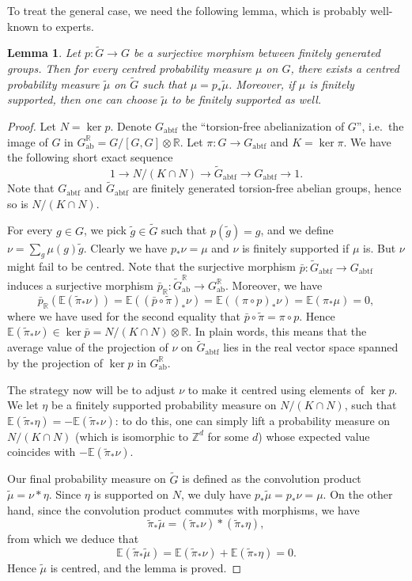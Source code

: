\documentclass[11pt,leqno]{article}
\theoremstyle{plain}
\newtheorem{lemma}[theorem]{Lemma}
\theoremstyle{definition}
\theoremstyle{remark}
\numberwithin{equation}{section}
\newcommand{\R}{\mathbb{R}}
\newcommand{\Z}{\mathbb{Z}}
\newcommand{\E}{\mathbb{E}}
\DeclareMathOperator{\id}{id}
\begin{document}
To treat the general case, we need the following  lemma, which is probably well-known to experts. 

\begin{lemma}\label{lem:liftcentred}
Let $p:\tilde{G}\to G$ be a surjective morphism between finitely generated groups. Then for every centred probability measure $\mu$ on $G$, there exists a centred probability measure $\tilde{\mu}$ on $\tilde{G}$ such that $\mu=p_*\tilde{\mu}$. Moreover, if $\mu$ is finitely supported, then one can choose $\tilde{\mu}$ to be finitely supported as well.
\end{lemma}
\begin{proof}
Let $N=\ker p$.
Denote $G_{\mathrm{abtf}}$ the ``torsion-free abelianization of $G$'', i.e.\ the image of $G$ in $G_{\mathrm{ab}}^{\mathbb{R}}=G/[G,G]\otimes \R$. Let $\pi:G\to G_{\mathrm{abtf}}$ and $K=\ker \pi$. We have the following short exact sequence 
\[1\to N/(K\cap N)\to \tilde{G}_{\mathrm{abtf}}\to G_{\mathrm{abtf}}\to 1.\]
Note that $G_{\mathrm{abtf}}$ and $\tilde{G}_{\mathrm{abtf}}$ are finitely generated torsion-free abelian groups, hence so is $N/(K\cap N)$. %

For every $g\in G$, we pick $\tilde{g}\in \tilde{G}$ such that $p(\tilde{g})=g$, and we define $\nu=\sum_{g} \mu(g)\tilde{g}$. Clearly we have $p_*\nu=\mu$ and $\nu$ is finitely supported if $\mu$ is. But $\nu$ might fail to be centred. Note that the surjective morphism $\bar{p}: \tilde{G}_{\mathrm{abtf}}\to G_{\mathrm{abtf}}$ induces a surjective morphism $\bar{p}_\R: \tilde{G}_{\mathrm{ab}}^{\mathbb{R}}\to G_{\mathrm{ab}}^{\mathbb{R}}$. Moreover, we have \[\bar{p}_\R(\E(\tilde{\pi}_*\nu))=\E((\bar{p}\circ\tilde{\pi})_*\nu)=\E((\pi\circ p)_*\nu)=\E(\pi_*\mu)=0,\]
where we have used for the second equality that $\bar{p}\circ\tilde{\pi}=\pi\circ p$.
Hence $\E(\tilde{\pi}_*\nu)\in \ker \bar{p}=N/(K\cap N)\otimes \R$. In plain words, this means that the average value of the projection of $\nu$ on $\tilde{G}_{\mathrm{abtf}}$ lies in the real vector space spanned by the projection of $\ker p$ in $G_{\mathrm{ab}}^{\mathbb{R}}$. 

The strategy now will be to adjust $\nu$ to make it centred using elements of  $\ker p$.
We let $\eta$ be a finitely supported probability measure on $N/(K\cap N)$, such that $\E(\tilde{\pi}_*\eta)=-\E(\tilde{\pi}_*\nu)$: to do this, one can simply lift a probability measure on $N/(K\cap N)$ (which is isomorphic to $\Z^d$ for some $d$) whose expected value coincides with $-\E(\tilde{\pi}_*\nu)$.

Our final probability measure on $\tilde{G}$
is defined as the convolution product $\tilde{\mu}=\nu*\eta$. Since $\eta$ is supported on $N$, we duly have $p_*\tilde{\mu}=p_*\nu=\mu$. On the other hand, since the convolution product commutes with morphisms, we have
\[\tilde{\pi}_*\tilde{\mu}=(\tilde{\pi}_*\nu)*(\tilde{\pi}_*\eta),\]
from which we deduce that 
\[\E(\tilde{\pi}_*\tilde{\mu})=\E(\tilde{\pi}_*\nu)+\E(\tilde{\pi}_*\eta)=0.\]
Hence $\tilde{\mu}$ is centred, and the lemma is proved.
\end{proof}
\end{document}

